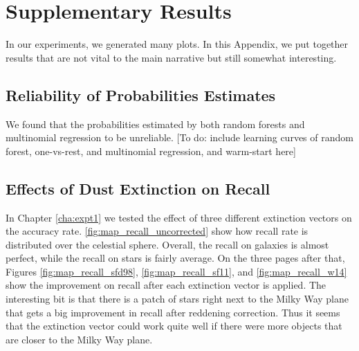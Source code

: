 \chapter{Supplementary Results}
\label{cha:supp}

In our experiments, we generated many plots. In this Appendix, we put together results
that are not vital to the main narrative but still somewhat interesting.

\section{Reliability of Probabilities Estimates}
\label{sec:forest_prob}
We found that the probabilities estimated by both random forests and multinomial regression
to be unreliable. [To do: include learning curves of random forest, one-vs-rest, and
multinomial regression, and warm-start here]


\section{Effects of Dust Extinction on Recall}

In Chapter \ref{cha:expt1} we tested the effect of three different extinction vectors 
on the accuracy rate. \ref{fig:map_recall_uncorrected} show how recall rate is distributed
over the celestial sphere. Overall, the recall on galaxies is almost perfect, while
the recall on stars is fairly average. On the three pages after that, Figures \ref{fig:map_recall_sfd98}, \ref{fig:map_recall_sf11}, and \ref{fig:map_recall_w14} show
the improvement on recall after each extinction vector is applied. The interesting bit
is that there is a patch of stars right next to the Milky Way plane that gets a big improvement
in recall after reddening correction. Thus it seems that the extinction vector could work
quite well if there were more objects that are closer to the Milky Way plane.



